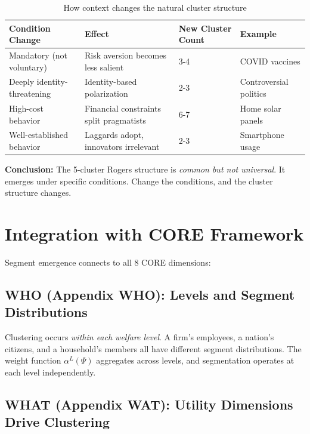 \begin{table}[h]
\centering
\small
\begin{tabular}{llll}
\toprule
\textbf{Condition Change} & \textbf{Effect} & \textbf{New Cluster Count} & \textbf{Example} \\
\midrule
Mandatory (not voluntary) & Risk aversion becomes less salient & 3-4 & COVID vaccines \\
Deeply identity-threatening & Identity-based polarization & 2-3 & Controversial politics \\
High-cost behavior & Financial constraints split pragmatists & 6-7 & Home solar panels \\
Well-established behavior & Laggards adopt, innovators irrelevant & 2-3 & Smartphone usage \\
\bottomrule
\end{tabular}
\caption{How context changes the natural cluster structure}
\label{tab:cluster-variance}
\end{table}

\textbf{Conclusion:} The 5-cluster Rogers structure is \textit{common but not universal}.
It emerges under specific conditions. Change the conditions, and the cluster
structure changes.

\section{Integration with CORE Framework}
\label{sec:ba-integration}

Segment emergence connects to all 8 CORE dimensions:

\subsection{WHO (Appendix WHO): Levels and Segment Distributions}

Clustering occurs \textit{within each welfare level}. A firm's employees, a
nation's citizens, and a household's members all have different segment distributions.
The weight function $\alpha^L(\Psi)$ aggregates across levels, and segmentation
operates at each level independently.

\subsection{WHAT (Appendix WAT): Utility Dimensions Drive Clustering}

